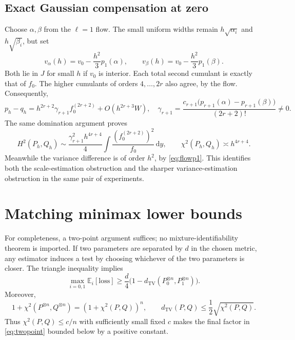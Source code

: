 \documentclass[11pt,a4paper]{article}
\numberwithin{equation}{section}
\theoremstyle{definition}
\theoremstyle{remark}
\newcommand{\E}{\mathbb E}
\newcommand{\dd}{\,\mathrm d}
\newcommand{\TV}{d_{\mathrm{TV}}}
\begin{document}
\subsection{Exact Gaussian compensation at zero}
Choose $\alpha,\beta$ from the $\ell=1$ flow. The small uniform widths remain
$h\sqrt{\alpha_i}$ and $h\sqrt{\beta_i}$, but set
\begin{equation}
 v_\alpha(h)=v_0-\frac{h^2}{3}p_1(\alpha),\qquad
 v_\beta(h)=v_0-\frac{h^2}{3}p_1(\beta).
 \label{eq:variancecompensation}
\end{equation}
Both lie in $J$ for small $h$ if $v_0$ is interior. Each total second cumulant
is exactly that of $f_0$. The higher cumulants of orders $4,\ldots,2r$ also
agree, by the flow. Consequently,
\begin{equation}
 p_h-q_h=h^{2r+2}\gamma_{r+1} f_0^{(2r+2)}+O(h^{2r+3}W),
 \quad
 \gamma_{r+1}=\frac{c_{r+1}\bigl(p_{r+1}(\alpha)-p_{r+1}(\beta)\bigr)}{(2r+2)!}
 \ne0.
 \label{eq:unknownzerojet}
\end{equation}
The same domination argument proves
\begin{equation}
 H^2(P_h,Q_h)\sim\frac{\gamma_{r+1}^2 h^{4r+4}}{4}
       \int\frac{(f_0^{(2r+2)})^2}{f_0}\dd y,
 \qquad \chi^2(P_h,Q_h)\asymp h^{4r+4}.
 \label{eq:unknownzerohell}
\end{equation}
Meanwhile the variance difference is of order $h^2$, by
\eqref{eq:flowp1}. This identifies both the scale-estimation obstruction and
the sharper variance-estimation obstruction in the same pair of experiments.

\section{Matching minimax lower bounds}
\label{sec:lower}

For completeness, a two-point argument suffices; no mixture-identifiability
theorem is imported. If two parameters are separated by $d$ in the chosen
metric, any estimator induces a test by choosing whichever of the two
parameters is closer. The triangle inequality implies
\begin{equation}
 \max_{i=0,1}\E_i[\text{loss}]\ge
     \frac{d}{4}\bigl(1-\TV(P_0^{\otimes n},P_1^{\otimes n})\bigr).
 \label{eq:twopoint}
\end{equation}
Moreover,
\begin{equation}
 1+\chi^2(P^{\otimes n},Q^{\otimes n})=(1+\chi^2(P,Q))^n,
 \qquad \TV(P,Q)\le\frac12\sqrt{\chi^2(P,Q)}.
\end{equation}
Thus $\chi^2(P,Q)\le c/n$ with sufficiently small fixed $c$ makes the final
factor in \eqref{eq:twopoint} bounded below by a positive constant.
\end{document}
